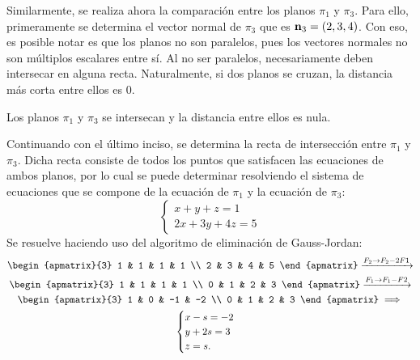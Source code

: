\documentclass{fmbvecto}
\begin{document}
\begin{problema}
Similarmente, se realiza ahora la comparación entre los planos \(\pi_1\) y \(\pi_3\). Para ello, primeramente se determina el vector normal de \(\pi_3\) que es \(\boldsymbol{{\mathbf{n}}}_3 = (2, 3, 4)\). Con eso, es posible notar es que los planos no son paralelos, pues los vectores normales no son múltiplos escalares entre sí. Al no ser paralelos, necesariamente deben intersecar en alguna recta. Naturalmente, si dos planos se cruzan, la distancia más corta entre ellos es 0.
\begin{gbox}
    Los planos \(\pi_1\) y \(\pi_3\) se intersecan y la distancia entre ellos es nula.
\end{gbox}

Continuando con el último inciso, se determina la recta de intersección entre \(\pi_1\) y \(\pi_3\). Dicha recta consiste de todos los puntos que satisfacen las ecuaciones de ambos planos, por lo cual se puede determinar resolviendo el sistema de ecuaciones que se compone de la ecuación de \(\pi_1\) y la ecuación de \(\pi_3\):
\[\begin{cases}
    x+y+z = 1 \\ 2x + 3y + 4z = 5
\end{cases}\]
Se resuelve haciendo uso del algoritmo de eliminación de Gauss-Jordan:
\begin{gather*}
    \begin{apmatrix}{3}
        1 & 1 & 1 & 1 \\
        2 & 3  & 4 & 5
    \end{apmatrix} \xrightarrow{F_2 \to F_2-2F1} \\
    \begin{apmatrix}{3}
        1 & 1 & 1 & 1 \\ 
        0 & 1  & 2 & 3
    \end{apmatrix} \xrightarrow{F_1 \to F_1-F2} \\
    \begin{apmatrix}{3}
        1 & 0 & -1 & -2 \\ 
        0 & 1  & 2 & 3
    \end{apmatrix} \implies \\
    \begin{cases}
    x-s=-2\\
    y+2s=3\\
    z=s.
\end{cases}
\end{gather*}


\end{problema}
\end{document}

